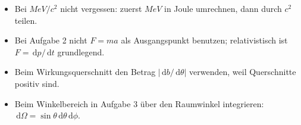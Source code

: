 \documentclass[11pt,a4paper]{scrartcl}
\newcommand{\abs}[1]{\left| #1 \right|}
\newcommand{\dd}{\,\mathrm{d}}
\theoremstyle{definition}
\theoremstyle{plain}
\theoremstyle{remark}
\begin{document}
\begin{warningbox}[title=Typische Fehler]
\begin{itemize}
    \item Bei $\si{MeV}/c^2$ nicht vergessen: zuerst $\si{MeV}$ in Joule umrechnen, dann durch $c^2$ teilen.
    \item Bei Aufgabe 2 nicht $F=ma$ als Ausgangspunkt benutzen; relativistisch ist $F=\dd p/\dd t$ grundlegend.
    \item Beim Wirkungsquerschnitt den Betrag $\abs{\dd b/\dd\theta}$ verwenden, weil Querschnitte positiv sind.
    \item Beim Winkelbereich in Aufgabe 3 über den Raumwinkel integrieren: $\dd\Omega=\sin\theta\dd\theta\dd\phi$.
\end{itemize}
\end{warningbox}
\end{document}
